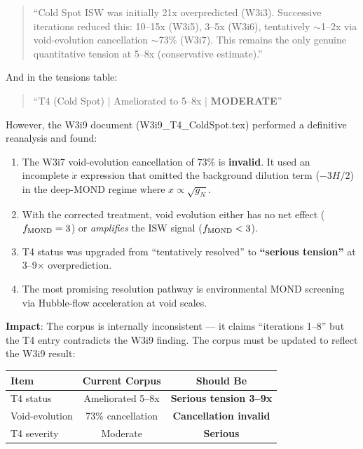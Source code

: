 \documentclass[11pt]{article}
\begin{document}
\begin{quote}
``Cold Spot ISW was initially 21x overpredicted (W3i3). Successive
iterations reduced this: 10--15x (W3i5), 3--5x (W3i6), tentatively
$\sim$1--2x via void-evolution cancellation $\sim$73\% (W3i7). This
remains the only genuine quantitative tension at 5--8x (conservative
estimate).''
\end{quote}

And in the tensions table:
\begin{quote}
``T4 (Cold Spot) | Ameliorated to 5--8x | \textbf{MODERATE}''
\end{quote}

However, the W3i9 document (W3i9\_T4\_ColdSpot.tex) performed a
definitive reanalysis and found:

\begin{enumerate}[nosep]
\item The W3i7 void-evolution cancellation of 73\% is \textbf{invalid}.
  It used an incomplete $\dot{x}$ expression that omitted the background
  dilution term ($-3H/2$) in the deep-MOND regime where $x \propto
  \sqrt{g_N}$.
\item With the corrected treatment, void evolution either has no net
  effect ($f_{\rm MOND} = 3$) or \emph{amplifies} the ISW signal
  ($f_{\rm MOND} < 3$).
\item T4 status was upgraded from ``tentatively resolved'' to
  \textbf{``serious tension''} at 3--9$\times$ overprediction.
\item The most promising resolution pathway is environmental MOND
  screening via Hubble-flow acceleration at void scales.
\end{enumerate}

\textbf{Impact}: The corpus is internally inconsistent --- it claims
``iterations 1--8'' but the T4 entry contradicts the W3i9 finding. The
corpus must be updated to reflect the W3i9 result:

\begin{center}
\begin{tabular}{lcc}
\toprule
\textbf{Item} & \textbf{Current Corpus} & \textbf{Should Be} \\
\midrule
T4 status & Ameliorated 5--8x & \textbf{Serious tension 3--9x} \\
Void-evolution & 73\% cancellation & \textbf{Cancellation invalid} \\
T4 severity & Moderate & \textbf{Serious} \\
\bottomrule
\end{tabular}
\end{center}
\end{document}
